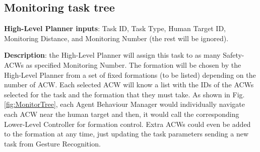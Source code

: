 \subsection{Monitoring task tree}
\label{sec:MonitoringTaskTree}
\textbf{High-Level Planner inputs}: Task ID, Task Type, Human Target ID, Monitoring Distance, and Monitoring Number (the rest will be ignored).

\textbf{Description}: the High-Level Planner will assign this task to as many Safety-ACWs as specified Monitoring Number. The formation will be chosen by the High-Level Planner from a set of fixed formations (to be listed) depending on the number of \gls{ACW}. Each selected \gls{ACW} will know a list with the IDs of the \glspl{ACW} selected for the task and the formation that they must take. As shown in Fig. \ref{fig:MonitorTree}, each Agent Behaviour Manager would individually navigate each \gls{ACW} near the human target and then, it would call the corresponding Lower-Level Controller for formation control. Extra \glspl{ACW} could even be added to the formation at any time, just updating the task parameters sending a new task from Gesture Recognition.

